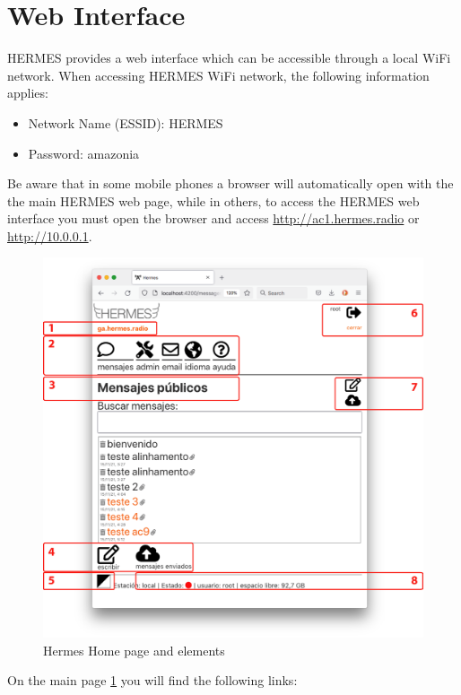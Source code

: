 \documentclass[11pt,a4paper]{article}
\begin{document}
\section{Web Interface}

HERMES provides a web interface which can be accessible through a local WiFi network. When accessing HERMES WiFi network, the following information applies:
\begin{itemize}
    \item Network Name (ESSID): HERMES
    \item Password: amazonia
\end{itemize}

Be aware that in some mobile phones a browser will automatically open with the the main HERMES web page, while in others, to access the HERMES web interface you must open the browser and access \url{http://ac1.hermes.radio} or \url{http://10.0.0.1}.

   \begin{figure}[!ht]
    \includegraphics[width=1\columnwidth]{pictures/interface-es.png}
    \caption{Hermes Home page and elements}
    \label{fig:interface}
    \end{figure}
    
On the main page \ref{fig:interface} you will find the following links:
\end{document}
